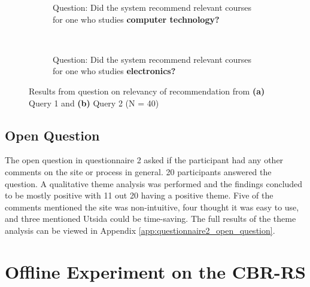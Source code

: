 \begin{figure}[h]
    \centering
    \begin{subfigure}[b]{0.4\textwidth}
        
        \caption{Question: Did the system recommend relevant courses for one who studies \textbf{computer technology?}}
        \label{fig:predesigned_2_p1}
    \end{subfigure}
    ~ \qquad %
    \begin{subfigure}[b]{0.4\textwidth}
       
        \caption{Question: Did the system recommend relevant courses for one who studies \textbf{electronics?}}
        \label{fig:predesigned_2_p2}
    \end{subfigure}
    \caption[Result for relevancy of pre-defined recommendation]{Results from question on relevancy of recommendation from \textbf{(a)} Query 1 and \textbf{(b)} Query 2 (N = 40)}
    \label{fig:predesigned_2}
\end{figure}


\FloatBarrier

\subsection{Open Question}

The open question in questionnaire 2 asked if the participant had any other comments on the site or process in general. 20 participants answered the question. A qualitative theme analysis \cite{oates2005researching} was performed and the findings concluded to be mostly positive with 11 out 20 having a positive theme. Five of the comments mentioned the site was non-intuitive, four thought it was easy to use, and three mentioned Utsida could be time-saving. The full results of the theme analysis can be viewed in Appendix \ref{app:questionnaire2_open_question}.

\FloatBarrier
\section{Offline Experiment on the CBR-RS}


